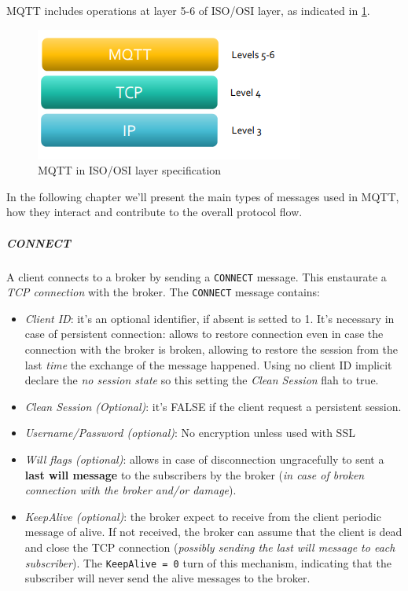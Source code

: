 \documentclass[10pt,a4paper]{report}
\theoremstyle{definition}
\begin{document}
MQTT includes operations at layer 5-6 of ISO/OSI layer, as indicated in \ref{mqtt-iso}.
\begin{figure}[h]
	\centering\includegraphics[scale=0.50]{images/Pasted image 20230303163018.png}
	\caption{MQTT in ISO/OSI layer specification}
	\label{mqtt-iso}
\end{figure}
In the following chapter we'll present the main types of messages used in MQTT, how they interact and contribute to the overall protocol flow. 
\subparagraph{CONNECT}\label{sec:connect}
A client connects to a broker by sending a \texttt{CONNECT} message. This enstaurate a \textit{TCP connection} with the broker. The \texttt{CONNECT} message contains:
\begin{itemize}
	\item 
	\textit{Client ID}: it's an optional identifier, if absent is setted to 1.  It's necessary in case of persistent connection: allows to restore connection even in case the connection with the broker is broken, allowing to restore the session from the last \textit{time} the exchange of the message happened. Using no client ID implicit declare the \textit{no session state} so this setting the \textit{Clean Session} flah to true.
	\item 
	\textit{Clean Session (Optional)}: it's FALSE if the client request a persistent session.
	\item 
	\textit{Username/Password (optional)}: No encryption unless used with SSL
	\item 
	\textit{Will flags (optional)}: allows in case of disconnection ungracefully to sent a \textbf{last will message} to the subscribers by the broker (\textit{in case of broken connection with the broker and/or damage}).
	\item 
	\textit{KeepAlive (optional)}: the broker expect to receive from the client periodic message of alive. If not received, the broker can assume that the client is dead and close the TCP connection (\textit{possibly sending the last will message to each subscriber}). The \texttt{KeepAlive = 0} turn of this mechanism, indicating that the subscriber will never send the alive messages to the broker.
\end{itemize}
\end{document}
